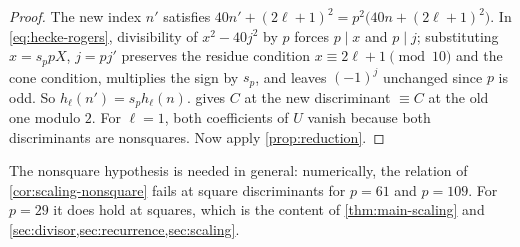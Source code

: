\begin{proof}
The new index $n'$ satisfies $40n'+(2\ell+1)^2=p^2\bigl(40n+(2\ell+1)^2\bigr)$. In
\eqref{eq:hecke-rogers}, divisibility of $x^2-40j^2$ by $p$ forces $p\mid x$ and
$p\mid j$; substituting $x=s_ppX$, $j=pj'$ preserves the residue condition
$x\equiv2\ell+1\pmod{10}$ and the cone condition, multiplies the sign by $s_p$,
and leaves $(-1)^j$ unchanged since $p$ is odd. So $h_\ell(n')=s_ph_\ell(n)$.
 gives $C$ at the new discriminant $\equiv C$ at the old one
modulo $2$. For $\ell=1$, both coefficients of $U$ vanish because both
discriminants are nonsquares. Now apply \cref{prop:reduction}.
\end{proof}

\begin{remark}
The nonsquare hypothesis is needed in general: numerically, the relation of
\cref{cor:scaling-nonsquare} fails at square discriminants for $p=61$ and
$p=109$. For $p=29$ it does hold at squares, which is the content of
\cref{thm:main-scaling} and \cref{sec:divisor,sec:recurrence,sec:scaling}.
\end{remark}
